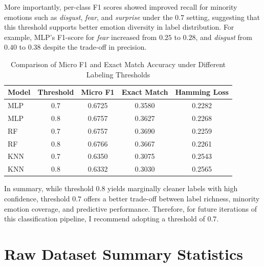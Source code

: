 \documentclass{article}
\begin{document}
More importantly, per-class F1 scores showed improved recall for minority emotions such as \textit{disgust}, \textit{fear}, and \textit{surprise} under the $0.7$ setting, suggesting that this threshold supports better emotion diversity in label distribution. For example, MLP's F1-score for \textit{fear} increased from $0.25$ to $0.28$, and \textit{disgust} from $0.40$ to $0.38$ despite the trade-off in precision.

\begin{table}[H]
\centering
\caption{Comparison of Micro F1 and Exact Match Accuracy under Different Labeling Thresholds}
\label{tab:threshold_comparison}
\begin{tabular}{lcccc}
\toprule
\textbf{Model} & \textbf{Threshold} & \textbf{Micro F1} & \textbf{Exact Match} & \textbf{Hamming Loss} \\
\midrule
MLP & 0.7 & 0.6725 & 0.3580 & 0.2282 \\
MLP & 0.8 & 0.6757 & 0.3627 & 0.2268 \\
RF  & 0.7 & 0.6757 & 0.3690 & 0.2259 \\
RF  & 0.8 & 0.6766 & 0.3667 & 0.2261 \\
KNN & 0.7 & 0.6350 & 0.3075 & 0.2543 \\
KNN & 0.8 & 0.6332 & 0.3030 & 0.2565 \\
\bottomrule
\end{tabular}
\end{table}

In summary, while threshold $0.8$ yields marginally cleaner labels with high confidence, threshold $0.7$ offers a better trade-off between label richness, minority emotion coverage, and predictive performance. Therefore, for future iterations of this classification pipeline, I recommend adopting a threshold of $0.7$.

\newpage

\section{Raw Dataset Summary Statistics}
\label{app:rawdata}
\end{document}
